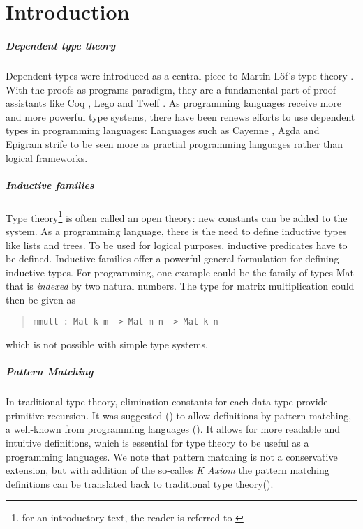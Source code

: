 \chapter{Introduction}

\paragraph*{Dependent type theory}

Dependent types were introduced as a central piece to Martin-L\"of's type theory \cite{mart84}. 
With the proofs-as-programs paradigm, they are a fundamental part of proof assistants like Coq \cite{coq}, Lego \cite{pollack94theory} and Twelf \cite{pfenning99system}.
As programming languages receive more and more powerful type systems, there have been renews efforts to use dependent types in programming languages: Languages such as Cayenne \cite{augustsson98cayenne}, Agda \cite{norell:thesis} and Epigram \cite{epigram} strife to be seen more as practial programming languages rather than logical frameworks. 

\paragraph*{Inductive families}
Type theory\footnote{for an introductory text, the reader is referred to \cite{NPS:promlt}}
 is often called an open theory: new constants can be added to the system.
As a programming language, there is the need to define inductive types like lists and trees.
To be used for logical purposes, inductive predicates have to be defined. 
Inductive families \cite{dybjer94inductive} offer a powerful general formulation for defining inductive types.  
For programming, one example could be the family of types Mat that is \emph{indexed} by two natural numbers.
The type for matrix multiplication could then be given as 
\begin{quote}
\begin{verbatim}
mmult : Mat k m -> Mat m n -> Mat k n 
\end{verbatim}
\end{quote}
which is not possible with simple type systems.
\paragraph*{Pattern Matching}
In traditional type theory, elimination constants for each data type provide primitive recursion. 
It was suggested (\cite{coquand92pattern}) to allow definitions by pattern matching, a well-known from programming languages (\cite{DBLP:conf/fpca/Augustsson85}).
It allows for more readable and intuitive definitions, which is essential for type theory to be useful as a programming languages. 
We note that pattern matching is not a conservative extension, but with addition of the so-calles \emph{K Axiom} the pattern matching definitions can be translated back to traditional type theory(\cite{hofmann95groupoid,GoguHMcBrCM2006}). 

